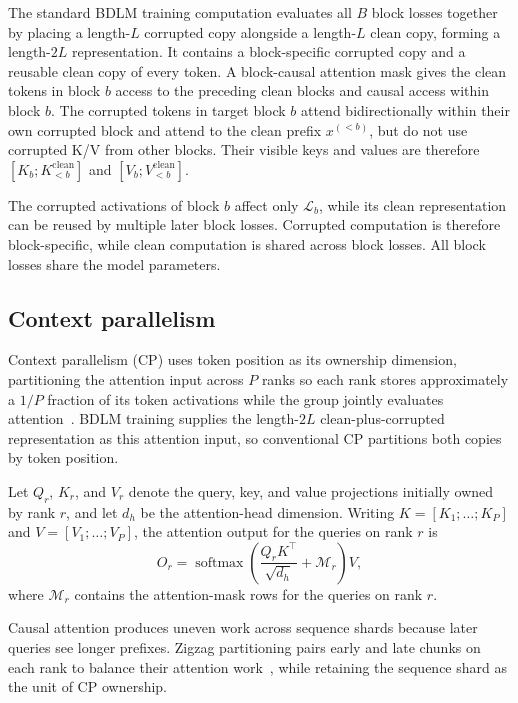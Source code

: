 The standard BDLM training computation evaluates all $B$ block losses together
by placing a length-$L$ corrupted copy alongside a length-$L$ clean copy,
forming a length-$2L$ representation. It contains a block-specific corrupted
copy and a reusable clean copy of every token. A block-causal attention mask
gives the clean tokens in block $b$ access to the preceding clean blocks and
causal access within block $b$. The corrupted tokens in target block $b$
attend bidirectionally within their own corrupted block and attend to the clean
prefix $x^{(<b)}$, but do not use corrupted K/V from other blocks. Their
visible keys and values are therefore
$[K_b;K_{<b}^{\mathrm{clean}}]$ and
$[V_b;V_{<b}^{\mathrm{clean}}]$.

The corrupted activations of block $b$ affect only $\mathcal{L}_b$, while its
clean representation can be reused by multiple later block losses. Corrupted
computation is therefore block-specific, while clean computation is shared
across block losses. All block losses share the model parameters.


\subsection{Context parallelism}
\label{sec:background-cp}
Context parallelism (CP) uses token position as its ownership dimension,
partitioning the attention input across $P$ ranks so each rank stores
approximately a $1/P$ fraction of its token activations while the group jointly
evaluates attention~\citep{liu2023ringattention,jacobs2023ulysses}. BDLM
training supplies the length-$2L$ clean-plus-corrupted representation as this
attention input, so conventional CP partitions both copies by token position.

Let $Q_r$, $K_r$, and $V_r$ denote the query, key, and value projections
initially owned by rank $r$, and let $d_h$ be the attention-head dimension.
Writing $K=[K_1;\ldots;K_P]$ and $V=[V_1;\ldots;V_P]$, the attention output
for the queries on rank $r$ is
\begin{equation}
O_r
=
\operatorname{softmax}\!\left(
    \frac{Q_rK^\top}{\sqrt{d_h}} + \mathcal{M}_r
\right)V,
\label{eq:context-parallel-attention}
\end{equation}
where $\mathcal{M}_r$ contains the attention-mask rows for the queries on rank
$r$.

Causal attention produces uneven work across sequence shards because later
queries see longer prefixes. Zigzag partitioning pairs early and late chunks
on each rank to balance their attention work~\citep{dubey2024llama3}, while
retaining the sequence shard as the unit of CP ownership.
